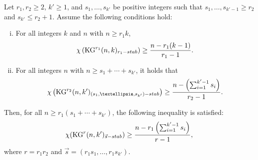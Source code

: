 \documentclass[10pt,a4paper]{amsart}
\begin{document}
\begin{lemma}\label{Lemma: Main} 
Let $r_1, r_2 \geq 2$, ${k'} \geq 1$, and $s_1, \ldots, s_{k'}$ be positive integers such that $s_1, \ldots, s_{k'-1} \geq r_2$ and $s_{k'}\leq r_2+1$. Assume the following conditions hold:
\begin{enumerate}[(i)]
    \item For all integers $k$ and $n$ with $n \geq r_1 k$, 
    \[ \chi \left(\mathrm{KG}^{r_1}(n,k)_{r_1\textup{-stab}}\right) \geq \frac{n - r_1 (k-1)}{r_1 - 1}. \]
    \item For all integers $n$ with $n \geq s_1 + \cdots + s_{k'}$, it holds that
    \[ \chi \left(\mathrm{KG}^{r_2}(n,k')_{(s_1, \ldots, s_{k'})\textup{-stab}}\right) \geq \frac{n - \left( \sum_{i=1}^{k'-1} s_i \right)}{r_2 - 1}. \]
\end{enumerate}
Then, for all $n \geq r_1(s_1 + \cdots + s_{k'})$, the following inequality is satisfied: 
\[ \chi (\mathrm{KG}^{r}(n,k')_{\vec{s}\textup{-stab}}) \geq \frac{n - r_1 \left( \sum_{i=1}^{k'-1} s_i \right)}{r - 1}, \] 
where $r = r_1 r_2$ and $\vec{s} = (r_1 s_1, \ldots, r_1 s_{k'})$. 
\end{lemma}
\end{document}
